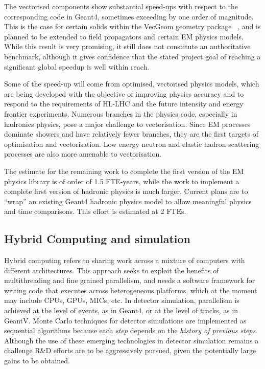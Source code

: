 \documentclass[12pt,a4paper]{article}
\begin{document}
{The vectorised components show substantial speed-ups with respect to the
corresponding code in Geant4, sometimes exceeding by one order of
magnitude. This is the case for certain solids within the VecGeom
geometry package ~\cite{1742-6596-608-1-012023}, and is planned to be extended to field
propagators and certain EM physics models. While this result is very
promising, it still does not constitute an authoritative benchmark,
although it gives confidence that the stated project goal of reaching a
significant global speedup is well within reach.

Some of the speed-up will come from optimised, vectorised physics
models, which are being developed with the objective of improving
physics accuracy and to respond to the requirements of HL-LHC and the
future intensity and energy frontier experiments. Numerous branches in
the physics code, especially in hadronics physics, pose a major
challenge to vectorisation. Since EM processes dominate showers and have
relatively fewer branches, they are the first targets of optimisation
and vectorisation. Low energy neutron and elastic hadron scattering
processes are also more amenable to vectorisation.

The estimate for the remaining work to complete the first version of the
EM physics library is of order of 1.5 FTE-years, while the work to
implement a complete first version of hadronic physics is much larger.
Current plans are to ``wrap'' an existing Geant4 hadronic physics model
to allow meaningful physics and time comparisons. This effort is
estimated at 2 FTEs.

\hypertarget{hybrid-computing-and-simulation}{%
\subsection{Hybrid Computing and
simulation}\label{hybrid-computing-and-simulation}}

Hybrid computing refers to sharing work across a mixture of computers
with different architectures. This approach seeks to exploit the
benefits of multithreading and fine grained parallelism, and needs a
software framework for writing code that executes across heterogeneous
platforms, which at the moment may include CPUs, GPUs, MICs, etc. In
detector simulation, parallelism is achieved at the level of events, as
in Geant4, or at the level of tracks, as in GeantV. Monte Carlo
techniques for detector simulations are implemented as sequential
algorithms because each \emph{step} depends on the \emph{history of
previous steps}. Although the use of these emerging technologies in
detector simulation remains a challenge R\&D efforts are to be
aggressively pursued, given the potentially large gains to be obtained.

}
\end{document}

